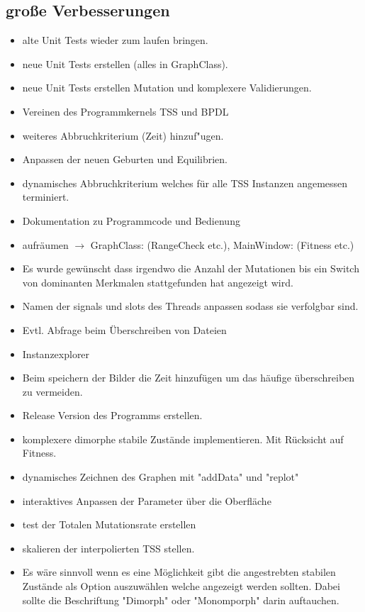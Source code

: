 \documentclass{article}
\begin{document}
\subsection{große Verbesserungen}
	\begin{itemize}
		
		\item alte Unit Tests wieder zum laufen bringen.
		\item neue Unit Tests erstellen (alles in GraphClass).
		\item neue Unit Tests erstellen Mutation und komplexere Validierungen.
		\item Vereinen des Programmkernels TSS und BPDL
		\item weiteres Abbruchkriterium (Zeit) hinzuf"ugen.
		
		\item Anpassen der neuen Geburten und Equilibrien.
		\item dynamisches Abbruchkriterium welches für alle TSS Instanzen angemessen terminiert.
		\item Dokumentation zu Programmcode und Bedienung
		\item aufräumen $ \to $ GraphClass: (RangeCheck etc.), MainWindow: (Fitness etc.)
		\item Es wurde gewünscht dass irgendwo die Anzahl der Mutationen bis ein Switch von dominanten Merkmalen stattgefunden hat angezeigt wird.
		

		\item Namen der signals und slots des Threads anpassen sodass sie verfolgbar sind.
		
		\item Evtl. Abfrage beim Überschreiben von Dateien
		\item Instanzexplorer
		
		\item Beim speichern der Bilder die Zeit hinzufügen um das häufige überschreiben zu vermeiden.
		\item Release Version des Programms erstellen.

		\item komplexere dimorphe stabile Zustände implementieren. Mit Rücksicht auf Fitness.
		\item dynamisches Zeichnen des Graphen mit "{}addData"{} und "{}replot"{}
		\item interaktives Anpassen der Parameter über die Oberfläche
		\item test der Totalen Mutationsrate erstellen
		\item skalieren der interpolierten TSS stellen.
		\item Es wäre sinnvoll wenn es eine Möglichkeit gibt die angestrebten stabilen Zustände als Option auszuwählen welche angezeigt werden sollten. Dabei sollte die Beschriftung "{}Dimorph"{} oder "{}Monomporph"{} darin auftauchen.
	\end{itemize}
\end{document}
